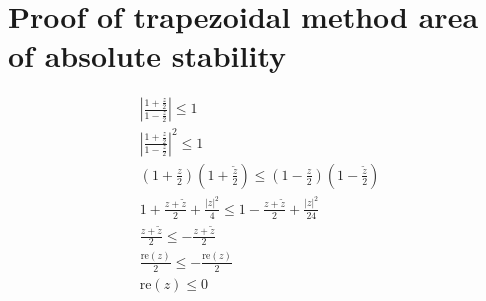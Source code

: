 \documentclass[12pt]{article}
\begin{document}
\section{Proof of trapezoidal method area of absolute stability}
\begin{align}
	|\frac{1+\frac{z}{2}}{1-\frac{z}{2}}|\leq 1                                              \\
	|\frac{1+\frac{z}{2}}{1-\frac{z}{2}}|^2\leq 1                                            \\
	(1+\frac{z}{2})(1+\frac{\tilde z }{2})\leq (1-\frac{z}{2})(1-\frac{\tilde z }{2})        \\
	1 + \frac{z+\tilde z}{2} + \frac{|z|^2}{4}\leq 1-\frac{z+\tilde z}{2} + \frac{|z|^2}{24} \\
	\frac{z+\tilde z}{2} \leq -\frac{z+\tilde z}{2}                                          \\
	\frac{\text{re}(z)}{2} \leq -\frac{\text{re}(z)}{2}                                      \\
	\text{re}(z) \leq 0
\end{align}
\end{document}

